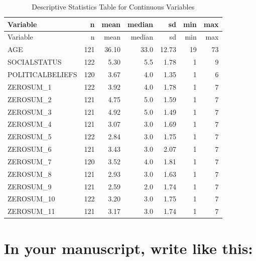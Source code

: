 \documentclass[
  english,
  letterpaper,
  DIV=11,
  numbers=noendperiod]{scrreprt}
\begin{document}
\begin{longtable}[]{@{}lrrrrrr@{}}
\caption{Descriptive Statistics Table for Continuous
Variables}\tabularnewline
\toprule\noalign{}
Variable & n & mean & median & sd & min & max \\
\midrule\noalign{}
\endfirsthead
\toprule\noalign{}
Variable & n & mean & median & sd & min & max \\
\midrule\noalign{}
\endhead
\bottomrule\noalign{}
\endlastfoot
AGE & 121 & 36.10 & 33.0 & 12.73 & 19 & 73 \\
SOCIALSTATUS & 122 & 5.30 & 5.5 & 1.78 & 1 & 9 \\
POLITICALBELIEFS & 120 & 3.67 & 4.0 & 1.35 & 1 & 6 \\
ZEROSUM\_1 & 122 & 3.92 & 4.0 & 1.78 & 1 & 7 \\
ZEROSUM\_2 & 121 & 4.75 & 5.0 & 1.59 & 1 & 7 \\
ZEROSUM\_3 & 121 & 4.92 & 5.0 & 1.49 & 1 & 7 \\
ZEROSUM\_4 & 121 & 3.07 & 3.0 & 1.69 & 1 & 7 \\
ZEROSUM\_5 & 122 & 2.84 & 3.0 & 1.75 & 1 & 7 \\
ZEROSUM\_6 & 121 & 3.43 & 3.0 & 2.07 & 1 & 7 \\
ZEROSUM\_7 & 120 & 3.52 & 4.0 & 1.81 & 1 & 7 \\
ZEROSUM\_8 & 121 & 2.93 & 3.0 & 1.63 & 1 & 7 \\
ZEROSUM\_9 & 121 & 2.59 & 2.0 & 1.74 & 1 & 7 \\
ZEROSUM\_10 & 122 & 3.20 & 3.0 & 1.75 & 1 & 7 \\
ZEROSUM\_11 & 121 & 3.17 & 3.0 & 1.74 & 1 & 7 \\
\end{longtable}

\section{In your manuscript, write like
this:}\label{in-your-manuscript-write-like-this-3}
\end{document}
